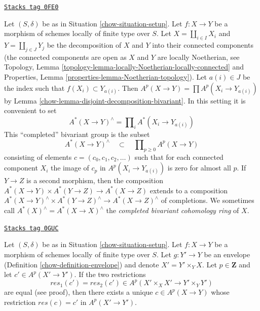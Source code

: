 \begin{remark}
\label{chow-remark-completion-bivariant}
\href{https://stacks.math.columbia.edu/tag/0FE0}{\texttt{Stacks tag 0FE0}}

Let $(S, \delta)$ be as in Situation \ref{chow-situation-setup}.
Let $f : X \to Y$ be a morphism of schemes locally of finite type over $S$.
Let $X = \coprod_{i \in I} X_i$ and $Y = \coprod_{j \in J} Y_j$
be the decomposition of $X$ and $Y$ into their connected components
(the connected components are open as $X$ and $Y$ are locally Noetherian, see
Topology, Lemma \ref{topology-lemma-locally-Noetherian-locally-connected} and
Properties, Lemma \ref{properties-lemma-Noetherian-topology}).
Let $a(i) \in J$ be the index such that $f(X_i) \subset Y_{a(i)}$.
Then $A^p(X \to Y) = \prod A^p(X_i \to Y_{a(i)})$ by
Lemma \ref{chow-lemma-disjoint-decomposition-bivariant}.
In this setting it is convenient to set
$$
A^*(X \to Y)^\wedge = \prod\nolimits_i A^*(X_i \to Y_{a(i)})
$$
This ``completed'' bivariant group is the subset
$$
A^*(X \to Y)^\wedge \quad\subset\quad \prod\nolimits_{p \geq 0} A^p(X \to Y)
$$
consisting of elements $c = (c_0, c_1, c_2, \ldots)$ such that
for each connected component $X_i$ the image of $c_p$ in
$A^p(X_i \to Y_{a(i)})$ is zero for almost all $p$.
If $Y \to Z$ is a second morphism, then the
composition $A^*(X \to Y) \times A^*(Y \to Z) \to A^*(X \to Z)$
extends to a composition
$A^*(X \to Y)^\wedge \times A^*(Y \to Z)^\wedge \to A^*(X \to Z)^\wedge$
of completions.
We sometimes call $A^*(X)^\wedge = A^*(X \to X)^\wedge$ the
{\it completed bivariant cohomology ring} of $X$.
\end{remark}

\begin{lemma}
\label{chow-lemma-envelope-bivariant}
\href{https://stacks.math.columbia.edu/tag/0GUC}{\texttt{Stacks tag 0GUC}}

Let $(S, \delta)$ be as in Situation \ref{chow-situation-setup}.
Let $f : X \to Y$ be a morphism of schemes locally of finite type over $S$.
Let $g : Y' \to Y$ be an envelope (Definition \ref{chow-definition-envelope})
and denote $X' = Y' \times_Y X$. Let $p \in \mathbf{Z}$ and let
$c' \in A^p(X' \to Y')$. If the two restrictions
$$
res_1(c') = res_2(c') \in A^p(X' \times_X X' \to Y' \times_Y Y')
$$
are equal (see proof), then there exists a unique $c \in A^p(X \to Y)$
whose restriction $res(c) = c'$ in $A^p(X' \to Y')$.
\end{lemma}

